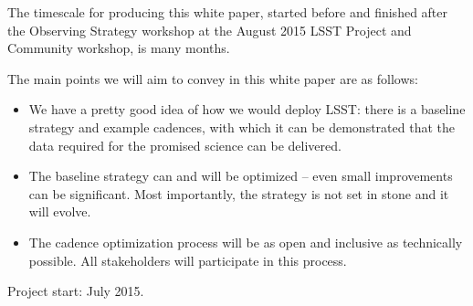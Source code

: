 \documentclass[11pt,headsepline,cleardoubleempty,twoside,openright]{scrbook}
\begin{document}
The timescale for producing this white paper, started before and
finished after the Observing Strategy workshop at the  August 2015
LSST Project and Community workshop, is many months.

The main points we will aim to convey in this white paper are as follows:

\begin{itemize}

    \item We have a pretty good idea of how we would deploy LSST:
    there is a baseline strategy and example cadences, with which it
    can be demonstrated that the data required for the promised
    science can be delivered.

    \item The baseline strategy can and will be optimized -- even small
    improvements can be significant. Most importantly, the strategy is
    not set in stone and it will evolve.

    \item The cadence optimization process will be as open and
    inclusive as technically possible. All stakeholders will
    participate in this process.

\end{itemize}

\raggedright{Project start: July 2015.}






















\end{document}
